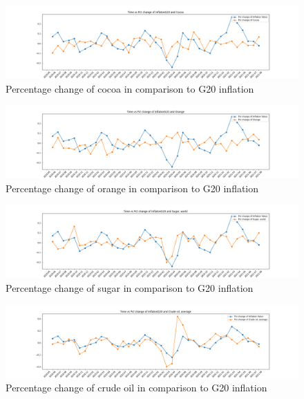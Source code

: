 \documentclass{scrartcl}
\begin{document}
\begin{figure} [H]
	\begin{center}
		\includegraphics[scale=0.3]{Graphics/pct_change_inflation_and_Cocoa.png}
	\end{center}
	\caption{Percentage change of cocoa in comparison to G20 inflation  }
	\label{fig:log-archi}
\end{figure}


\begin{figure} [H]
	\begin{center}
		\includegraphics[scale=0.3]{Graphics/pct_change_inflation_and_Orange.png}
	\end{center}
	\caption{Percentage change of orange in comparison to G20 inflation  }
	\label{fig:log-archi}
\end{figure}


\begin{figure} [H]
	\begin{center}
		\includegraphics[scale=0.3]{Graphics/pct_change_inflation_and_Sugar, world.png}
	\end{center}
	\caption{Percentage change of sugar in comparison to G20 inflation  }
	\label{fig:log-archi}
\end{figure}


\begin{figure} [H]
	\begin{center}
		\includegraphics[scale=0.3]{Graphics/pct_change_inflation_and_Crude oil, average.png}
	\end{center}
	\caption{Percentage change of crude oil in comparison to G20 inflation  }
	\label{fig:log-archi}
\end{figure}
\end{document}
